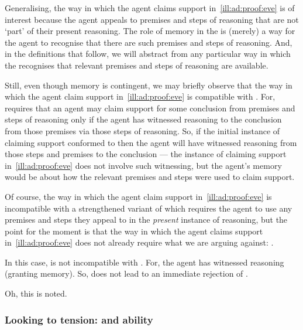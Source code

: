 \begin{note}
  Generalising, the way in which the agent claims support in~\autoref{ill:ad:proof:eve} is of interest because the agent appeals to premises and steps of reasoning that are not `part' of their present reasoning.
  The role of memory in the  is (merely) a way for the agent to recognise that there are such premises and steps of reasoning.
  And, in the definitions that follow, we will abstract from any particular way in which the recognises that relevant premises and steps of reasoning are available.

  Still, even though memory is contingent, we may briefly observe that the way in which the agent claim support in~\autoref{ill:ad:proof:eve} is compatible with \ESU{}.
  For, \ESU{} requires that an agent may claim support for some conclusion from premises and steps of reasoning only if the agent has witnessed reasoning to the conclusion from those premises via those steps of reasoning.
  So, if the initial instance of claiming support conformed to \ESU{} then the agent will have witnessed reasoning from those steps and premises to the conclusion --- the instance of claiming support in~\autoref{ill:ad:proof:eve} does not involve such witnessing, but the agent's memory would be about how the relevant premises and steps were used to claim support.

  Of course, the way in which the agent claim support in~\autoref{ill:ad:proof:eve} is incompatible with a strengthened variant of \ESU{} which requires the agent to use any premises and steps they appeal to in the \emph{present} instance of reasoning, but the point for the moment is that the way in which the agent claims support in~\autoref{ill:ad:proof:eve} does not already require what we are arguing against: \ESU{}.
\end{note}

\begin{note}
  \color{red}
  In this case, \adB{} is not incompatible with \ESU{}.
  For, the agent has witnessed reasoning (granting memory).
  So, \ESU{} does not lead to an immediate rejection of \adB{}.

  Oh, this is noted.
\end{note}


\subsubsection{Looking to tension: \adB{} and ability}
\label{sec:looking-tension}


